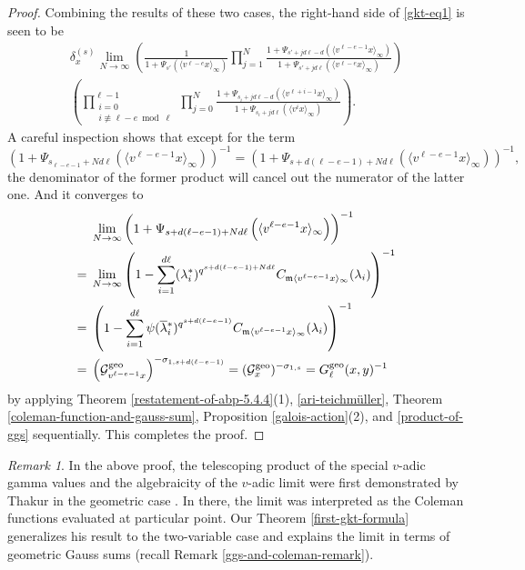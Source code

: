 \documentclass[11pt]{amsart}
\theoremstyle{plain}
\theoremstyle{definition}
\theoremstyle{remark}
\newtheorem{rem}[thm]{Remark}
\numberwithin{equation}{section}
\newcommand{\mfk}{\mathfrak{m}}
\newcommand{\Gcal}{\mathcal{G}}
\newcommand{\ovl}{\overline}
\newcommand{\anginf}[1]{\langle #1 \rangle_\infty}
\newcommand{\bggs}{\Gcal^{\textnormal{geo}}}
\newcommand{\ggs}{G_\l^{\textnormal{geo}}}
\let\l\ell
\begin{document}
\begin{proof}
		Combining the results of these two cases, the right-hand side of \eqref{gkt-eq1} is seen to be
		\begin{multline*}
			\delta_x^{(s)}
			\lim_{N\to\infty} \left( \frac{1}{1+ \Psi_{s'} \left(\anginf{v^{\l-e}x}\right)} \prod_{j=1}^N \frac{1+\Psi_{s'+jd\l-d} \left(\anginf{v^{\l-e-1}x}\right)}{1+\Psi_{s'+jd\l} \left(\anginf{v^{\l-e}x}\right)} \right)
			\\
			\left( \prod_{\substack{i=0 \\ i \not\equiv \l-e \bmod \l}}^{\l-1} \prod_{j=0}^N \frac{1+\Psi_{s_i+jd\l-d} \left(\anginf{v^{\l+i-1}x}\right)}{1+\Psi_{s_i+jd\l} \left(\anginf{v^ix}\right)} \right).
		\end{multline*}
		A careful inspection shows that except for the term
		$$
		\left(1+\Psi_{s_{\l-e-1}+Nd\l} \left(\anginf{v^{\l-e-1}x}\right) \right)^{-1}
		= \left(1+\Psi_{s+d(\l-e-1)+Nd\l} \left(\anginf{v^{\l-e-1}x}\right) \right)^{-1},
		$$
		the denominator of the former product will cancel out the numerator of the latter one.
		And it converges to
		\begin{align*}
			&\lim_{N \to \infty} \left(1+\Psi_{s+d(\l-e-1)+Nd\l} \left(\anginf{v^{\l-e-1}x}\right) \right)^{-1}   \\
			={} &\lim_{N \to \infty} \left( 1 - \sum_{i=1}^{d\l} (\lambda_i^*)^{q^{s+d(\l-e-1)+Nd\l}} C_{\mfk\anginf{v^{\l-e-1}x}}(\lambda_i) \right)^{-1}    \\
			={} &\left( 1 - \sum_{i=1}^{d\l} \psi(\ovl{\lambda}{}^*_i)^{q^{s+d(\l-e-1)}} C_{\mfk\anginf{v^{\l-e-1}x}}(\lambda_i) \right)^{-1}   \\
			={} &\left(\bggs_{v^{\l-e-1}x}\right)^{-\sigma_{1,s+d(\l-e-1)}}
			= (\bggs_x)^{-\sigma_{1,s}}
			= \ggs (x,y)^{-1}
		\end{align*}
		by applying Theorem \ref{restatement-of-abp-5.4.4}(1), \eqref{ari-teichmüller}, Theorem \ref{coleman-function-and-gauss-sum}, Proposition \ref{galois-action}(2), and \eqref{product-of-ggs} sequentially.
		This completes the proof.
	\end{proof}
	
	\begin{rem}
		In the above proof, the telescoping product of the special $v$-adic gamma values and the algebraicity of the $v$-adic limit were first demonstrated by Thakur in the geometric case \cite[Section 8.6]{thakur2004function}.
		In there, the limit was interpreted as the Coleman functions evaluated at particular point.
		Our Theorem \ref{first-gkt-formula} generalizes his result to the two-variable case and explains the limit in terms of geometric Gauss sums (recall Remark \ref{ggs-and-coleman-remark}).
	\end{rem}
	
\end{document}
